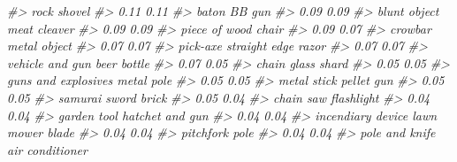 \documentclass[
  12pt,
]{book}
\newenvironment{Shaded}{\begin{snugshade}}{\end{snugshade}}
\newcommand{\CommentTok}[1]{\textcolor[rgb]{0.56,0.35,0.01}{\textit{#1}}}
\begin{document}
\begin{Shaded}
\begin{Highlighting}[]
\CommentTok{\#>                             rock                           shovel }
\CommentTok{\#>                             0.11                             0.11 }
\CommentTok{\#>                            baton                           BB gun }
\CommentTok{\#>                             0.09                             0.09 }
\CommentTok{\#>                     blunt object                     meat cleaver }
\CommentTok{\#>                             0.09                             0.09 }
\CommentTok{\#>                    piece of wood                            chair }
\CommentTok{\#>                             0.09                             0.07 }
\CommentTok{\#>                          crowbar                     metal object }
\CommentTok{\#>                             0.07                             0.07 }
\CommentTok{\#>                         pick{-}axe              straight edge razor }
\CommentTok{\#>                             0.07                             0.07 }
\CommentTok{\#>                  vehicle and gun                      beer bottle }
\CommentTok{\#>                             0.07                             0.05 }
\CommentTok{\#>                            chain                      glass shard }
\CommentTok{\#>                             0.05                             0.05 }
\CommentTok{\#>              guns and explosives                       metal pole }
\CommentTok{\#>                             0.05                             0.05 }
\CommentTok{\#>                      metal stick                       pellet gun }
\CommentTok{\#>                             0.05                             0.05 }
\CommentTok{\#>                    samurai sword                            brick }
\CommentTok{\#>                             0.05                             0.04 }
\CommentTok{\#>                        chain saw                       flashlight }
\CommentTok{\#>                             0.04                             0.04 }
\CommentTok{\#>                      garden tool                  hatchet and gun }
\CommentTok{\#>                             0.04                             0.04 }
\CommentTok{\#>                incendiary device                 lawn mower blade }
\CommentTok{\#>                             0.04                             0.04 }
\CommentTok{\#>                        pitchfork                             pole }
\CommentTok{\#>                             0.04                             0.04 }
\CommentTok{\#>                   pole and knife                  air conditioner }

\end{Highlighting}
\end{Shaded}
\end{document}
